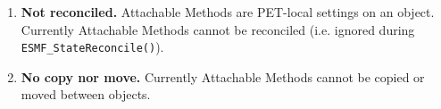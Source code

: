 %


\begin{enumerate}
\item{\bf Not reconciled.}
Attachable Methods are PET-local settings on an object. Currently Attachable
Methods cannot be reconciled (i.e. ignored during {\tt ESMF\_StateReconcile()}).
\item{\bf No copy nor move.}
Currently Attachable Methods cannot be copied or moved between objects.
\end{enumerate}




